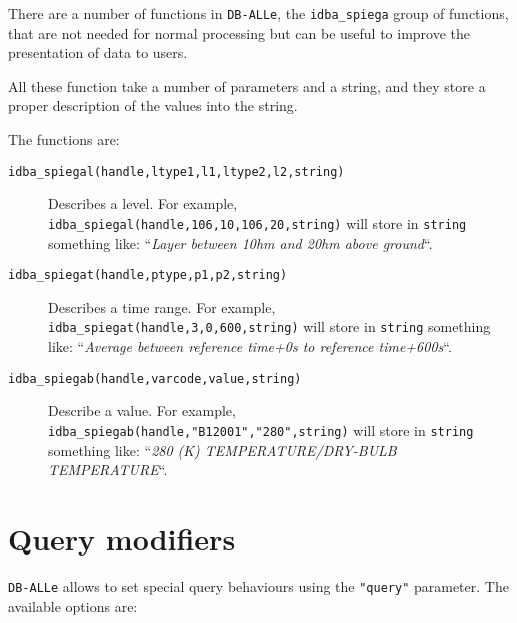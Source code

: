\documentclass[final,12pt,a4paper,twoside]{book}
\newcommand{\dballe}{{\tt DB-ALLe}}
\begin{document}
\label{fun-pprint}

There are a number of functions in \dballe{}, the {\tt idba\_spiega\*} group of
functions, that are not needed for normal processing but can be useful to
improve the presentation of data to users.

All these function take a number of parameters and a string, and they store a
proper description of the values into the string.

The functions are:

\begin{description}
\item[{\tt idba\_spiegal(handle,ltype1,l1,ltype2,l2,string)}]
  Describes a level.  For example, {\tt idba\_spiegal(handle,106,10,106,20,string)}
  will store in {\tt string} something like: ``\emph{Layer between 10hm and
  20hm above ground}``.
\item[{\tt idba\_spiegat(handle,ptype,p1,p2,string)}]
  Describes a time range.  For example, {\tt idba\_spiegat(handle,3,0,600,string)}
  will store in {\tt string} something like: ``\emph{Average between reference
  time+0s to reference time+600s}``.
\item[{\tt idba\_spiegab(handle,varcode,value,string)}]
  Describe a value.  For example, {\tt idba\_spiegab(handle,"B12001","280",string)}
  will store in {\tt string} something like: ``\emph{280 (K)
  TEMPERATURE/DRY-BULB TEMPERATURE}``.
\end{description}

\section{Query modifiers}

\dballe{} allows to set special query behaviours using the {\tt "query"}
parameter.  The available options are:
\end{document}
